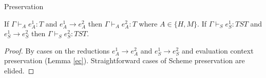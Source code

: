 \begin{theorem}{Preservation}

\label{thmpre}

If $\Gamma\vdash_{A}e_{A}^{1}:T$ and $e_{A}^{1}\rightarrow e_{A}^{2}$ then $\Gamma\vdash_{A}e_{A}^{2}:T$ where $A\in\lbrace H,M\rbrace$.  If $\Gamma\vdash_{S}e_{S}^{1}:TST$ and $e_{S}^{1}\rightarrow e_{S}^{2}$ then $\Gamma\vdash_{S}e_{S}^{2}:TST$.

\begin{proof}

By cases on the reductions $e_{A}^{1}\rightarrow e_{A}^{2}$ and $e_{S}^{1}\rightarrow e_{S}^{2}$ and evaluation context preservation (Lemma \ref{ec}).  Straightforward cases of Scheme preservation are elided.










































\end{proof}
\end{theorem}
